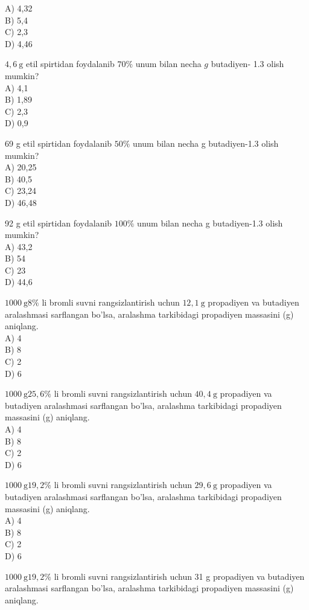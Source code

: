 A) 4,32\\
B) 5,4\\
C) 2,3\\
D) 4,46
  \item $4,6 \mathrm{~g}$ etil spirtidan foydalanib $70 \%$ unum bilan necha $g$ butadiyen- 1.3 olish mumkin?\\
A) 4,1\\
B) 1,89\\
C) 2,3\\
D) 0,9
  \item 69 g etil spirtidan foydalanib $50 \%$ unum bilan necha g butadiyen-1.3 olish mumkin?\\
A) 20,25\\
B) 40,5\\
C) 23,24\\
D) 46,48
  \item 92 g etil spirtidan foydalanib $100 \%$ unum bilan necha g butadiyen-1.3 olish mumkin?\\
A) 43,2\\
B) 54\\
C) 23\\
D) 44,6
  \item $1000 \mathrm{~g} 8 \%$ li bromli suvni rangsizlantirish uchun $12,1 \mathrm{~g}$ propadiyen va butadiyen aralashmasi sarflangan bo'lsa, aralashma tarkibidagi propadiyen massasini (g) aniqlang.\\
A) 4\\
B) 8\\
C) 2\\
D) 6\\
  \item $1000 \mathrm{~g} 25,6 \%$ li bromli suvni rangsizlantirish uchun $40,4 \mathrm{~g}$ propadiyen va butadiyen aralashmasi sarflangan bo'lsa, aralashma tarkibidagi propadiyen massasini (g) aniqlang.\\
A) 4\\
B) 8\\
C) 2\\
D) 6
  \item $1000 \mathrm{~g} 19,2 \%$ li bromli suvni rangsizlantirish uchun $29,6 \mathrm{~g}$ propadiyen va butadiyen aralashmasi sarflangan bo'lsa, aralashma tarkibidagi propadiyen massasini (g) aniqlang.\\
A) 4\\
B) 8\\
C) 2\\
D) 6
  \item $1000 \mathrm{~g} 19,2 \%$ li bromli suvni rangsizlantirish uchun 31 g propadiyen va butadiyen aralashmasi sarflangan bo'lsa, aralashma tarkibidagi propadiyen massasini (g) aniqlang.\\
